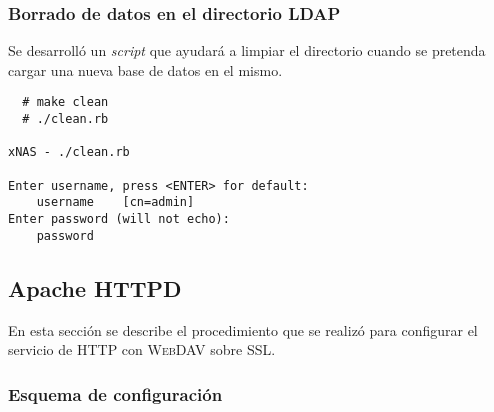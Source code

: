 {
 \begin{table}[H]
 \caption{\textit{Script} de carga de objetos en el directorio}{}
 \label{tab:load-rb}
 \noindent{} %
 \end{table}
}

          \subsubsection {Borrado de datos en el directorio \textsc{LDAP}}

Se desarroll\'{o} un \emph{\gls{script}} que ayudar\'{a} a limpiar el directorio cuando se pretenda cargar una nueva base de datos en el mismo.

{
\scriptsize
\linespread{1}
\begin{verbatim}
  # make clean
  # ./clean.rb

xNAS - ./clean.rb

Enter username, press <ENTER> for default:
    username	[cn=admin]
Enter password (will not echo):
    password
\end{verbatim}
}

      \subsection {Apache \textsc{HTTPD}}

En esta secci\'{o}n se describe el procedimiento que se realiz\'{o} para configurar el servicio de \textsc{\gls{HTTP}} con \textsc{\gls{WebDAV}} sobre \textsc{\gls{SSL}}.

        \subsubsection {Esquema de configuraci\'{o}n}

